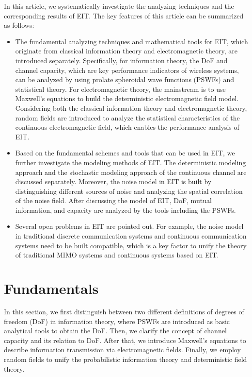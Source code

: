 \documentclass[journal,twocolumn]{IEEEtran}
\begin{document}
In this article, we systematically investigate the analyzing techniques and the corresponding results of EIT. The key features of this article can be summarized as follows:
\begin{itemize}
\item{The fundamental analyzing techniques and mathematical tools for EIT, which originate from classical information theory and electromagnetic theory, are introduced separately. Specifically, for information theory, the DoF and channel capacity, which are key performance indicators of wireless systems, can be analyzed by using prolate spheroidal wave functions (PSWFs) and statistical theory. For electromagnetic theory, the mainstream is to use Maxwell's equations to build the deterministic electromagnetic field model. Considering both the classical information theory and electromagnetic theory, random fields are introduced to analyze the statistical characteristics of the continuous electromagnetic field, which enables the performance analysis of EIT. }
\item{Based on the fundamental schemes and tools that can be used in EIT, we further investigate the modeling methods of EIT. The deterministic modeling approach and the stochastic modeling approach of the continuous channel are discussed separately. Moreover, the noise model in EIT is built by distinguishing different sources of noise and analyzing the spatial correlation of the noise field. After discussing the model of EIT, DoF, mutual information, and capacity are analyzed by the tools including the PSWFs.} 
\item{Several open problems in EIT are pointed out. For example, the noise model in traditional discrete communication systems and continuous communication systems need to be built compatible, which is a key factor to unify the theory of traditional MIMO systems and continuous systems based on EIT.}
\end{itemize}

\section{Fundamentals}
In this section, we first distinguish between two different definitions of degrees of freedom (DoF) in information theory, where PSWFs are introduced as basic analytical tools to obtain the DoF. 
Then, we clarify the concept of channel capacity and its relation to DoF. 
After that, we introduce Maxwell's equations to describe information transmission via electromagnetic fields. 
Finally, we employ random fields to unify the probabilistic information theory and deterministic field theory. 
\end{document}
